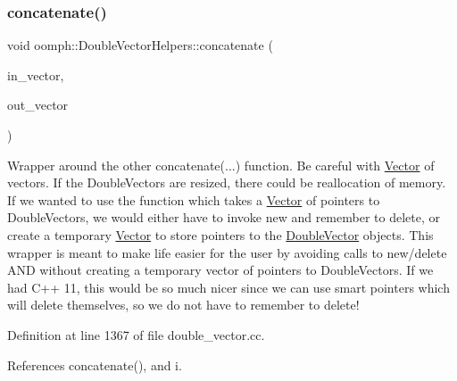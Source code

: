 \subsubsection{\texorpdfstring{concatenate()}{concatenate()}\hspace{0.1cm}{\footnotesize\ttfamily [2/2]}}
{\footnotesize\ttfamily void oomph\+::\+Double\+Vector\+Helpers\+::concatenate (\begin{DoxyParamCaption}\item[{\hyperlink{classoomph_1_1Vector}{Vector}$<$ \hyperlink{classoomph_1_1DoubleVector}{Double\+Vector} $>$ \&}]{in\+\_\+vector,  }\item[{\hyperlink{classoomph_1_1DoubleVector}{Double\+Vector} \&}]{out\+\_\+vector }\end{DoxyParamCaption})}



Wrapper around the other concatenate(...) function. Be careful with \hyperlink{classoomph_1_1Vector}{Vector} of vectors. If the Double\+Vectors are resized, there could be reallocation of memory. If we wanted to use the function which takes a \hyperlink{classoomph_1_1Vector}{Vector} of pointers to Double\+Vectors, we would either have to invoke new and remember to delete, or create a temporary \hyperlink{classoomph_1_1Vector}{Vector} to store pointers to the \hyperlink{classoomph_1_1DoubleVector}{Double\+Vector} objects. This wrapper is meant to make life easier for the user by avoiding calls to new/delete A\+ND without creating a temporary vector of pointers to Double\+Vectors. If we had C++ 11, this would be so much nicer since we can use smart pointers which will delete themselves, so we do not have to remember to delete! 



Definition at line 1367 of file double\+\_\+vector.\+cc.



References concatenate(), and i.

\mbox{\label{namespaceoomph_1_1DoubleVectorHelpers_ac69d6979ffbf4987684c0e025d107947}} 
